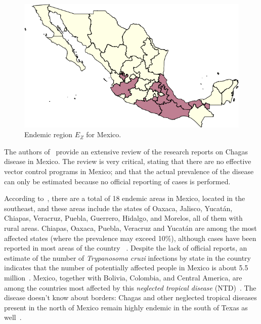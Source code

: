 \begin{figure}[ht]
\centering
\includegraphics[width=0.75\linewidth]
{figures/Ambientes_Gran_Chaco-Mexico1/Ambientes_Gran_Chaco-Mexico1.png}
\caption{Endemic region $E_Z$ for Mexico.}
\label{fig:endemic_zone_mexico}
\end{figure}


The authors of~\cite{carabarin2013chagas} provide an extensive review of the
research reports on Chagas disease in Mexico.
The review is very critical, stating that there are no effective vector control programs in Mexico;
and that the actual prevalence of the disease
can only be estimated because no official reporting of cases is performed.

According to~\cite{dumonteil1999update},
there are a total of 18 endemic areas in Mexico, located in the southeast, and
these areas include the states of Oaxaca, Jalisco, Yucatán, Chiapas, Veracruz,
Puebla, Guerrero, Hidalgo, and Morelos, all of them with rural areas.
Chiapas, Oaxaca, Puebla, Veracruz and Yucatán are among the most affected states (where the prevalence may exceed 10\%), although cases have been reported in most areas of the country
~\cite{cruz2006chagmex,dumonteil1999update}.
Despite the lack of official reports, an estimate of the number of \textit{Trypanosoma cruzi} infections by state in the country
indicates that the number of potentially
affected people in Mexico is about 5.5 million~\cite{carabarin2013chagas}.
Mexico, together with Bolivia, Colombia, and Central
America, are among the countries most affected by this
\textit{neglected tropical disease} (NTD)~\cite{hotez2013innovation}.
The disease doesn't know about borders:
Chagas and other neglected tropical diseases present in the north of Mexico remain highly endemic in the south of Texas as well~\cite{hotez2012texas}.

